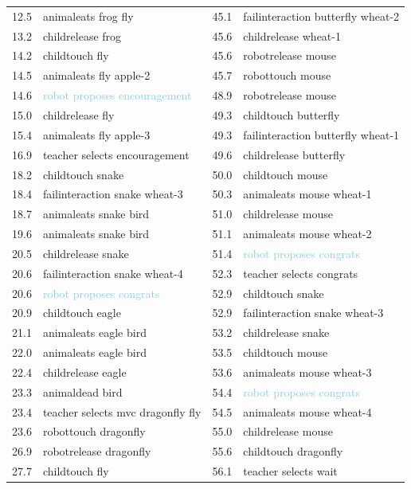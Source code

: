 {\begin{table}[ht]
\begin{tabularx}{\textwidth}{@{}L{.2}L{1.8}|L{.2}L{1.8}@{}}
			12.5 & animaleats frog fly & 45.1 & failinteraction butterfly wheat-2\\
			13.2 & childrelease frog & 45.6 & childrelease wheat-1\\
			14.2 & childtouch fly & 45.6 & robotrelease mouse\\
			14.5 & animaleats fly apple-2 & 45.7 & robottouch mouse\\
			14.6 & \textcolor{SkyBlue}{robot proposes encouragement} & 48.9 & robotrelease mouse\\
			15.0 & childrelease fly & 49.3 & childtouch butterfly\\
			15.4 & animaleats fly apple-3 & 49.3 & failinteraction butterfly wheat-1\\
			16.9 & \textcolor{BurntOrange}{teacher selects encouragement} & 49.6 & childrelease butterfly\\
			18.2 & childtouch snake & 50.0 & childtouch mouse\\
			18.4 & failinteraction snake wheat-3 & 50.3 & animaleats mouse wheat-1\\
			18.7 & animaleats snake bird & 51.0 & childrelease mouse\\
			19.6 & animaleats snake bird & 51.1 & animaleats mouse wheat-2\\
			20.5 & childrelease snake & 51.4 & \textcolor{SkyBlue}{robot proposes congrats}\\
			20.6 & failinteraction snake wheat-4 & 52.3 & \textcolor{BurntOrange}{teacher selects congrats}\\
			20.6 & \textcolor{SkyBlue}{robot proposes congrats} & 52.9 & childtouch snake\\
			20.9 & childtouch eagle & 52.9 & failinteraction snake wheat-3\\
			21.1 & animaleats eagle bird & 53.2 & childrelease snake\\
			22.0 & animaleats eagle bird & 53.5 & childtouch mouse\\
			22.4 & childrelease eagle & 53.6 & animaleats mouse wheat-3\\
			23.3 & animaldead bird & 54.4 & \textcolor{SkyBlue}{robot proposes congrats}\\
			23.4 & \textcolor{BurntOrange}{teacher selects mvc dragonfly fly} & 54.5 & animaleats mouse wheat-4\\
			23.6 & robottouch dragonfly & 55.0 & childrelease mouse\\
			26.9 & robotrelease dragonfly & 55.6 & childtouch dragonfly\\
			27.7 & childtouch fly & 56.1 & \textcolor{BurntOrange}{teacher selects wait}\\

\end{tabularx}
\end{table}}
